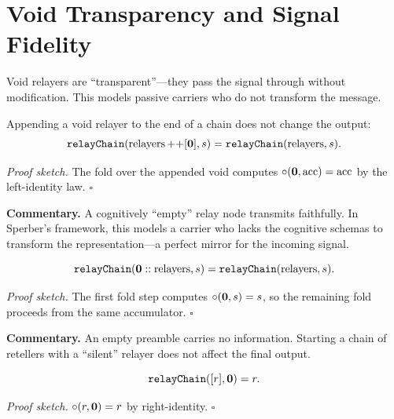 \section{Void Transparency and Signal Fidelity}
\label{sec:ch18-void}

Void relayers are ``transparent''---they pass the signal through without
modification.  This models passive carriers who do not transform the message.

\begin{theorem}
\label{thm:void_relayer_transparent}
Appending a void relayer to the end of a chain does not change the output:
\[
  \texttt{relayChain}(\text{relayers} \mathop{++} [\mathbf{0}], s) =
  \texttt{relayChain}(\text{relayers}, s).
\]
\end{theorem}

\noindent\textit{Proof sketch.}\quad
The fold over the appended void computes $\circ(\mathbf{0}, \text{acc}) =
\text{acc}$ by the left-identity law.
\hfill$\square$

\medskip

\noindent\textbf{Commentary.}
A cognitively ``empty'' relay node transmits faithfully.  In Sperber's
framework, this models a carrier who lacks the cognitive schemas to
transform the representation---a perfect mirror for the incoming signal.

\begin{theorem}
\label{thm:void_prepend_chain}
\[
  \texttt{relayChain}(\mathbf{0} :: \text{relayers}, s) =
  \texttt{relayChain}(\text{relayers}, s).
\]
\end{theorem}

\noindent\textit{Proof sketch.}\quad
The first fold step computes $\circ(\mathbf{0}, s) = s$, so the remaining
fold proceeds from the same accumulator.
\hfill$\square$

\medskip

\noindent\textbf{Commentary.}
An empty preamble carries no information.  Starting a chain of retellers
with a ``silent'' relayer does not affect the final output.

\begin{theorem}
\label{thm:void_signal_single_relay}
\[
  \texttt{relayChain}([r], \mathbf{0}) = r.
\]
\end{theorem}

\noindent\textit{Proof sketch.}\quad
$\circ(r, \mathbf{0}) = r$ by right-identity.
\hfill$\square$

